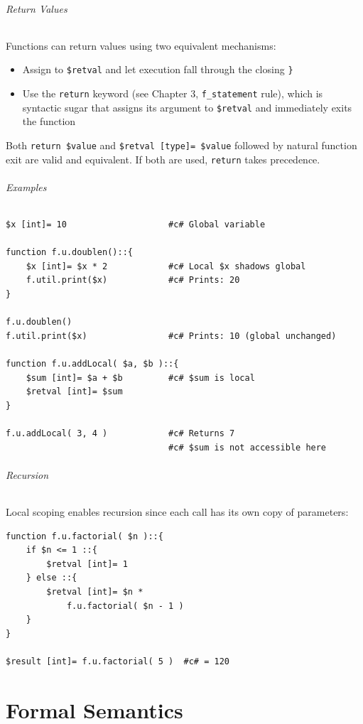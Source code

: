 \paragraph{Return Values}
Functions can return values using two equivalent mechanisms:
\begin{itemize}
\item Assign to \texttt{\$retval} and let execution fall through the closing \texttt{\}}
\item Use the \texttt{return} keyword (see Chapter 3, \texttt{f\_statement} rule), which is syntactic sugar that assigns its argument to \texttt{\$retval} and immediately exits the function
\end{itemize}
Both \texttt{return \$value} and \texttt{\$retval [type]= \$value} followed by natural function exit are valid and equivalent. If both are used, \texttt{return} takes precedence.

\paragraph{Examples}
\begin{verbatim}
$x [int]= 10                    #c# Global variable

function f.u.doublen()::{
    $x [int]= $x * 2            #c# Local $x shadows global
    f.util.print($x)            #c# Prints: 20
}

f.u.doublen()
f.util.print($x)                #c# Prints: 10 (global unchanged)

function f.u.addLocal( $a, $b )::{
    $sum [int]= $a + $b         #c# $sum is local
    $retval [int]= $sum
}

f.u.addLocal( 3, 4 )            #c# Returns 7
                                #c# $sum is not accessible here
\end{verbatim}

\paragraph{Recursion}
Local scoping enables recursion since each call has its own copy of parameters:
\begin{verbatim}
function f.u.factorial( $n )::{
    if $n <= 1 ::{
        $retval [int]= 1
    } else ::{
        $retval [int]= $n * 
            f.u.factorial( $n - 1 )
    }
}

$result [int]= f.u.factorial( 5 )  #c# = 120
\end{verbatim}




\part{Formal Semantics}
